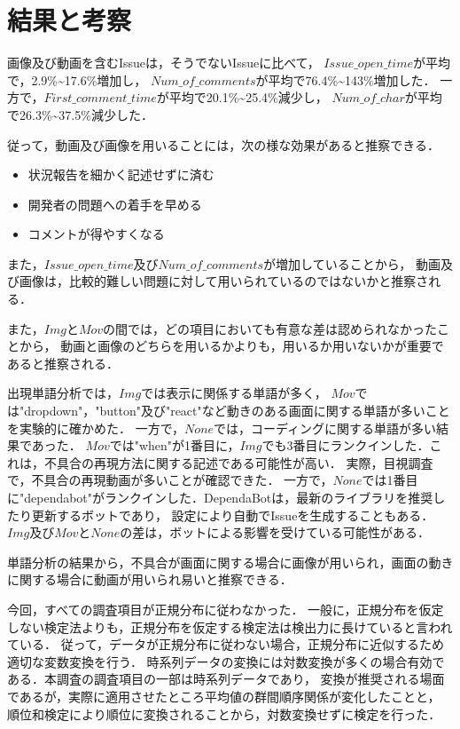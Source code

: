 \section{結果と考察\label{research}}

画像及び動画を含むIssueは，そうでないIssueに比べて，
$Issue\_open\_time$が平均で，2.9\%\textasciitilde17.6\%増加し，
$Num\_of\_comments$が平均で76.4\%\textasciitilde143\%増加した．
一方で，$First\_comment\_time$が平均で20.1\%\textasciitilde25.4\%減少し，
$Num\_of\_char$が平均で26.3\%\textasciitilde 37.5\%減少した．

従って，動画及び画像を用いることには，次の様な効果があると推察できる．
\begin{itemize}
  \item 状況報告を細かく記述せずに済む
  \item 開発者の問題への着手を早める
  \item コメントが得やすくなる
\end{itemize}
また，$Issue\_open\_time$及び$Num\_of\_comments$が増加していることから，
動画及び画像は，比較的難しい問題に対して用いられているのではないかと推察される．

また，$Img$と$Mov$の間では，どの項目においても有意な差は認められなかったことから，
動画と画像のどちらを用いるかよりも，用いるか用いないかが重要であると推察される．

出現単語分析では，$Img$では表示に関係する単語が多く，
$Mov$では"dropdown"，"button"及び"react"など動きのある画面に関する単語が多いことを実験的に確かめた．
一方で，$None$では，コーディングに関する単語が多い結果であった．
$Mov$では"when"が1番目に，$Img$でも3番目にランクインした．これは，不具合の再現方法に関する記述である可能性が高い．
実際，目視調査で，不具合の再現動画が多いことが確認できた．
一方で，$None$では1番目に"dependabot"がランクインした．DependaBotは，最新のライブラリを推奨したり更新するボットであり，
設定により自動でIssueを生成することもある．
$Img$及び$Mov$と$None$の差は，ボットによる影響を受けている可能性がある．

単語分析の結果から，不具合が画面に関する場合に画像が用いられ，画面の動きに関する場合に動画が用いられ易いと推察できる．

今回，すべての調査項目が正規分布に従わなかった．
一般に，正規分布を仮定しない検定法よりも，正規分布を仮定する検定法は検出力に長けていると言われている．
従って，データが正規分布に従わない場合，正規分布に近似するため適切な変数変換を行う．
時系列データの変換には対数変換が多くの場合有効である．本調査の調査項目の一部は時系列データであり，
変換が推奨される場面であるが，実際に適用させたところ平均値の群間順序関係が変化したことと，
順位和検定により順位に変換されることから，対数変換せずに検定を行った．

